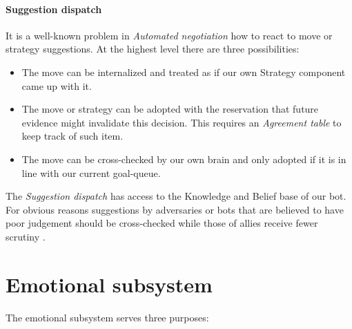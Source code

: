 \documentclass[pdftex,12pt,a4paper]{report}
\begin{document}
\paragraph{Suggestion dispatch}
It is a well-known problem in \textit{Automated negotiation} how 
to react to move or strategy suggestions. At the highest level there
are three possibilities:

\begin{itemize}

\item The move can be internalized and treated as if our own 
      Strategy component came up with it. 

\item The move or strategy can be adopted with the reservation 
      that future evidence might invalidate this decision. This 
      requires an \textit{Agreement table} to keep track of such
      item.

\item The move can be cross-checked by our own brain and only 
      adopted if it is in line with our current goal-queue. 

\end{itemize}

The \textit{Suggestion dispatch} has access to the Knowledge and
Belief base of our bot. For obvious reasons suggestions by
adversaries or bots that are believed to have poor judgement 
should be cross-checked while those of allies receive fewer
scrutiny . \\

\section{Emotional subsystem}

The emotional subsystem serves three purposes:
\end{document}
